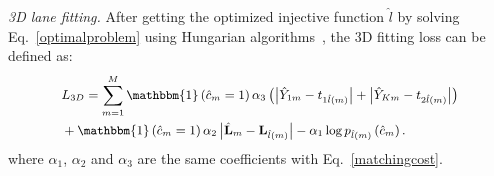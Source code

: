 \documentclass[letterpaper]{article} \usepackage{aaai22}  \usepackage{times}  \usepackage{helvet}  \usepackage{courier}  \usepackage[hyphens]{url}  \usepackage{graphicx} \urlstyle{rm} \def\UrlFont{\rm}  \usepackage{natbib}  \usepackage{caption}
\begin{document}
\emph{3D lane fitting.} After getting the optimized injective function $\hat{l}$ by solving Eq.~\ref{optimalproblem} using Hungarian algorithms~\cite{DETR}, the 3D fitting loss can be defined as:
\begin{equation}\small
\label{lossin3d}
\begin{split}
& L_{3D} = \sum_{m=1}^M \mathbbm{1}\left(\hat{c}_m = 1\right) \alpha_3 \left(\left|\hat{Y}_{1m} - t_{1\hat{l}\left(m\right)}\right| + \left|\hat{Y}_{Km} - t_{2\hat{l}\left(m\right)}\right|\right)
\\
& +   \mathbbm{1}\left(\hat{c}_m = 1\right) \alpha_2 \left|\hat{\mathbf{L}}_m - \mathbf{L}_{\hat{l}\left(m\right)} \right|  -\alpha_1 \log p_{\hat{l}\left(m\right)}\left(\hat{c}_m\right).
\end{split}
\end{equation}
where $\alpha_1$, $\alpha_2$ and $\alpha_3$ are the same coefficients with Eq.~\ref{matchingcost}.
\end{document}
